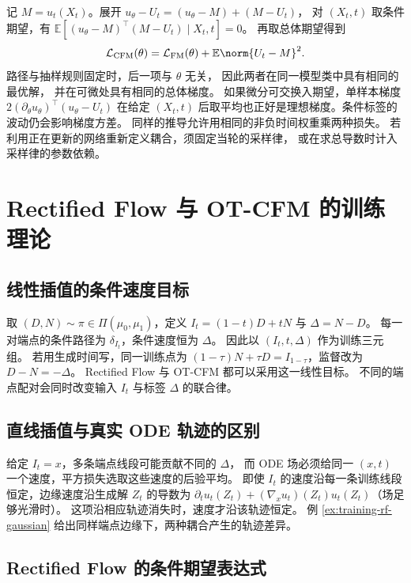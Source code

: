 记 \(M=u_t(X_t)\)。展开 \(u_\theta-U_t=(u_\theta-M)+(M-U_t)\)，
对 \((X_t,t)\) 取条件期望，有
\(\mathbb E[(u_\theta-M)^\top(M-U_t)\mid X_t,t]=0\)。
再取总体期望得到
\begin{equation}
  \mathcal L_{\mathrm{CFM}}(\theta)
    =\mathcal L_{\mathrm{FM}}(\theta)+\mathbb E\norm{U_t-M}^2 .
  \label{eq:training-cfm-identity}
\end{equation}
路径与抽样规则固定时，后一项与 \(\theta\) 无关，
因此两者在同一模型类中具有相同的最优解，
并在可微处具有相同的总体梯度。
如果微分可交换入期望，单样本梯度
\(2(\partial_\theta u_\theta)^\top(u_\theta-U_t)\) 在给定 \((X_t,t)\)
后取平均也正好是理想梯度。条件标签的波动仍会影响梯度方差。
同样的推导允许用相同的非负时间权重乘两种损失。
若利用正在更新的网络重新定义耦合，须固定当轮的采样律，
或在求总导数时计入采样律的参数依赖。

\section{Rectified Flow 与 OT-CFM 的训练理论}
\label{sec:training-rectified}

\subsection{线性插值的条件速度目标}

取 \((D,N)\sim\pi\in\Pi(\mu_0,\mu_1)\)，定义
\(I_t=(1-t)D+tN\) 与 \(\Delta=N-D\)。
每一对端点的条件路径为 \(\delta_{I_t}\)，条件速度恒为 \(\Delta\)。
因此以 \((I_t,t,\Delta)\) 作为训练三元组。
若用生成时间写，同一训练点为
\((1-\tau)N+\tau D=I_{1-\tau}\)，监督改为 \(D-N=-\Delta\)。
Rectified Flow 与 OT-CFM 都可以采用这一线性目标。
不同的端点配对会同时改变输入 \(I_t\) 与标签 \(\Delta\) 的联合律。

\subsection{直线插值与真实 ODE 轨迹的区别}

给定 \(I_t=x\)，多条端点线段可能贡献不同的 \(\Delta\)，
而 ODE 场必须给同一 \((x,t)\) 一个速度，平方损失选取这些速度的后验平均。
即使 \(I_t\) 的速度沿每一条训练线段恒定，边缘速度沿生成解 \(Z_t\) 的导数为
\(\partial_tu_t(Z_t)+(\nabla_xu_t)(Z_t)u_t(Z_t)\)（场足够光滑时）。
这项沿相应轨迹消失时，速度才沿该轨迹恒定。
例 \ref{ex:training-rf-gaussian} 给出同样端点边缘下，两种耦合产生的轨迹差异。

\subsection{Rectified Flow 的条件期望表达式\requiredderivation}

